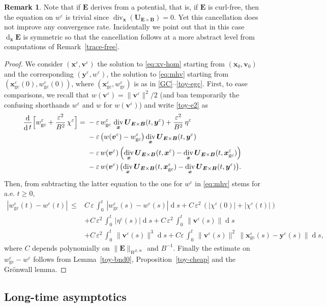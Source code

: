 \documentclass[JEP,XML,SOM,Unicode]{cedram}
\let\eps\varepsilon
\DeclareMathOperator\dD{d}\let\dd\dD
\DeclareMathOperator{\Div}{div}
\theoremstyle{plain}
\theoremstyle{definition}
\newtheorem{remark}[theorem]{Remark}
\newcommand\br{\begin{remark}}
\newcommand\er{\end{remark}}
\newcommand\bB{{\boldsymbol B}}
\newcommand\bE{{\boldsymbol E}}
\newcommand\bU{{\boldsymbol U}}
\newcommand\bfv{{\boldsymbol v}}
\newcommand\bfx{{\boldsymbol x}}
\newcommand\bfy{{\boldsymbol y}}
\let\e w
\newcommand{\GC}{\bfx_\mathrm{gc}}
\newcommand{\eGC}{w_\mathrm{gc}}
\newcommand{\EcB}{\bU_{\bE\times\bB}}
\begin{document}
\br
Note that if $\bE$ derives from a potential, that is, if $\bE$ is curl-free, then the equation on $\e^\eps$ is trivial since $\Div_\bfx (\EcB)=0$. Yet this cancellation does not improve any convergence rate. Incidentally we point out that in this case $\dD_\bfx\bE$ is symmetric so that the cancellation follows at a more abstract level from computations of Remark~\ref{trace-free}.
\er

\begin{proof}
We consider $(\bfx^\eps,\bfv^\eps)$ the solution to \eqref{eq:xv-hom} starting from $(\bfx_0,\bfv_0)$ and the corresponding $(\bfy^\eps,\e^\eps)$, the solution to \eqref{eq:mhv} starting from $(\GC^\eps(0),\eGC^\eps(0))$, where $(\GC^\eps,\eGC^\eps)$ is as in \eqref{GC}--\eqref{toy-egc}. First, to ease comparisons, we recall that \hbox{$\e(\bfv^\eps)=\|\bfv^\eps\|^2/2$} (and ban temporarily the confusing shorthands $\e^\eps$ and $\e$ for $\e(\bfv^\eps)$) and write \eqref{toy-e2} as
\begin{align*}
\frac{\dD}{\dD t}\Bigl[\eGC^\eps+\frac{\eps^2}{B^2}\,\chi^\eps\Bigr]
={}&-\eps\,\eGC^\eps\,\Div_\bfx\EcB(t,\bfy^\eps)+\frac{\eps^2}{B^2}\,\eta^\eps
\\
& -\eps\left(\e(\bfv^\eps)-\eGC^\eps\right)\Div_\bfx\EcB(t,\bfy^\eps)
\\
&-\eps\,\e(\bfv^\eps)\left(\Div_\bfx\EcB(t,\bfx^\eps)-\Div_\bfx\EcB(t,\GC^\eps)\right)
\\
&-\eps\,\e(\bfv^\eps)\,\bigl(\Div_\bfx\EcB(t,\GC^\eps)-\Div_\bfx\EcB(t,\bfy^\eps)\bigr).
\end{align*}
Then, from subtracting the latter equation to the one for $\e^\eps$ in \eqref{eq:mhv} stems for a.e. $t\geq0$,
\begin{align*}
|\eGC^\eps(t)-\e^\eps(t)|\
\leq{}&{}C\,\eps\,\int_0^t\,|\eGC^\eps(s)-\e^\eps(s)|\dD s
+C\,\eps^2\,\left(|\chi^\eps(0)|+|\chi^\eps(t)|\right)\\
&+C\,\eps^2\,\int_0^t\,|\eta^\eps(s)|\dD s
+C\,\eps^2\,\int_0^t\,\|\bfv^\eps(s)\|\dD s\\
&+C\,\eps^2\,\int_0^t\,\|\bfv^\eps(s)\|^3\dD s
+C\eps\,\int_0^t\,\|\bfv^\eps(s)\|^2\,\|\GC^\eps(s)-\bfy^\eps(s)\|\dD s,
\end{align*}
where $C$ depends polynomially on $\|\bE\|_{W^{2,\infty}}$ and $B^{-1}$. Finally the estimate on $\eGC^\eps-\e^\eps$ follows from Lemma~\ref{toy-bnd0}, Proposition~\ref{toy-cheap} and the Grönwall lemma.
\end{proof}

\subsection{Long-time asymptotics}
\label{s:toy-long}
\end{document}
